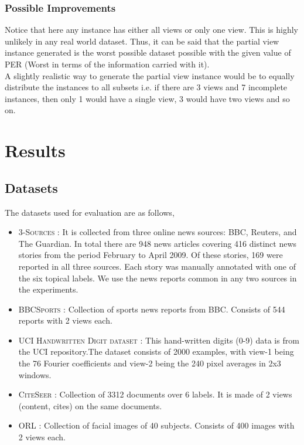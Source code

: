 \documentclass[a4paper]{article}
\begin{document}
	\subsubsection{Possible Improvements}
	
	Notice that here any instance has either all views or only one view. This is highly unlikely in any real world dataset. Thus, it can be said that the partial view instance generated is the worst possible dataset possible with the given value of PER (Worst in terms of the information carried with it).\\
	A slightly realistic way to generate the partial view instance would be to equally distribute the instances to all subsets i.e. if there are 3 views and 7 incomplete instances, then only 1 would have a single view, 3 would have two views and so on.
	
	\section{Results}

	\subsection{Datasets}
	
	The datasets used for evaluation are as follows,
	\begin{itemize}
	\item \textsc{3-Sources} : It is collected from three online news sources: BBC, Reuters, and The Guardian. In total there are 948 news articles covering 416 distinct news stories from the period February to April 2009. Of these stories, 169 were reported in all three sources. Each story was manually annotated with one of the six topical labels. We use the news reports common in any two sources in the experiments.
	\item \textsc{BBCSports} : Collection of sports news reports from BBC. Consists of 544 reports with 2 views each.
	\item \textsc{UCI Handwritten Digit dataset} : This hand-written digits (0-9) data is from the UCI repository.The dataset consists of 2000 examples, with view-1 being the 76 Fourier coefficients and view-2 being the 240 pixel averages in 2x3 windows.	
	\item \textsc{CiteSeer} : Collection of 3312 documents over 6 labels. It is made of 2 views (content, cites) on the same documents.
	\item \textsc{ORL} : Collection of facial images of 40 subjects. Consists of 400 images with 2 views each.	
	\end{itemize}
	
\end{document}

